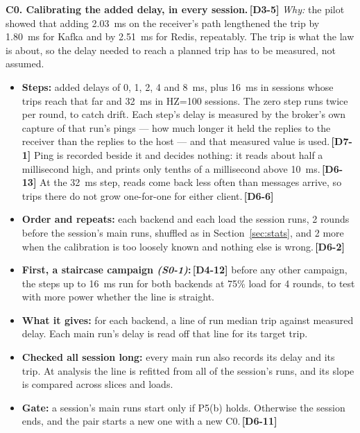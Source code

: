\documentclass[11pt]{article}
\newcommand{\gl}[1]{{\color{soft}\itshape\small (#1)}}
\newcommand{\chgold}[1]{\,{\color{oldcol}\bfseries\footnotesize[#1]}}
\begin{document}
\textbf{C0. Calibrating the added delay, in every session.}\chgold{D3-5} \emph{Why:} the pilot showed that adding 2.03~ms on the receiver's path lengthened the trip by 1.80~ms for Kafka and by 2.51~ms for Redis, repeatably. The trip is what the law is about, so the delay needed to reach a planned trip has to be measured, not assumed.
\begin{itemize}
  \item \textbf{Steps:} added delays of 0, 1, 2, 4 and 8~ms, plus 16~ms in sessions whose trips reach that far and 32~ms in HZ=100 sessions. The zero step runs twice per round, to catch drift. Each step's delay is measured by the broker's own capture of that run's pings --- how much longer it held the replies to the receiver than the replies to the host --- and that measured value is used.\chgold{D7-1} Ping is recorded beside it and decides nothing: it reads about half a millisecond high, and prints only tenths of a millisecond above 10~ms.\chgold{D6-13} At the 32~ms step, reads come back less often than messages arrive, so trips there do not grow one-for-one for either client.\chgold{D6-6}
  \item \textbf{Order and repeats:} each backend and each load the session runs, 2 rounds before the session's main runs, shuffled as in Section~\ref{sec:stats}, and 2 more when the calibration is too loosely known and nothing else is wrong.\chgold{D6-2}
  \item \textbf{First, a staircase campaign \gl{S0-1}:}\chgold{D4-12} before any other campaign, the steps up to 16~ms run for both backends at 75\% load for 4 rounds, to test with more power whether the line is straight.
  \item \textbf{What it gives:} for each backend, a line of run median trip against measured delay. Each main run's delay is read off that line for its target trip.
  \item \textbf{Checked all session long:} every main run also records its delay and its trip. At analysis the line is refitted from all of the session's runs, and its slope is compared across slices and loads.
  \item \textbf{Gate:} a session's main runs start only if P5(b) holds. Otherwise the session ends, and the pair starts a new one with a new C0.\chgold{D6-11}
\end{itemize}
\end{document}
